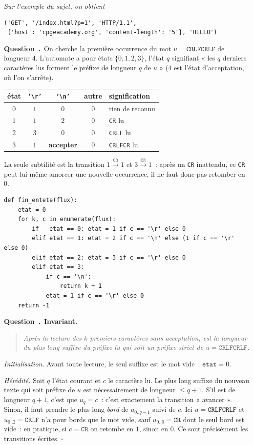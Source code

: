 \documentclass[11pt,a4paper]{article}
\renewcommand{\Q}{\medskip\par\stepcounter{qcnt}\noindent\textbf{\color{cnc}Question~\theqcnt.}~}
\begin{document}
\emph{Sur l'exemple du sujet, on obtient}
\begin{lstlisting}
('GET', '/index.html?p=1', 'HTTP/1.1',
 {'host': 'cpgeacademy.org', 'content-length': '5'}, 'HELLO')
\end{lstlisting}

\Q On cherche la première occurrence du mot $u=\texttt{CRLFCRLF}$ de longueur $4$. L'automate
a pour états $\{0,1,2,3\}$, l'état $q$ signifiant « les $q$ derniers caractères lus forment
le préfixe de longueur $q$ de $u$ » ($4$ est l'état d'acceptation, où l'on s'arrête).

\begin{center}\small
\begin{tabular}{c|c|c|c|l}
état & \texttt{'\textbackslash r'} & \texttt{'\textbackslash n'} & autre &
 signification\\\hline
$0$ & $1$ & $0$ & $0$ & rien de reconnu\\
$1$ & $1$ & $2$ & $0$ & \texttt{CR} lu\\
$2$ & $3$ & $0$ & $0$ & \texttt{CRLF} lu\\
$3$ & $1$ & \textbf{accepter} & $0$ & \texttt{CRLFCR} lu
\end{tabular}
\end{center}
La seule subtilité est la transition $1\xrightarrow{\texttt{CR}}1$ et
$3\xrightarrow{\texttt{CR}}1$~: après un \texttt{CR} inattendu, ce \texttt{CR} peut lui-même
amorcer une nouvelle occurrence, il ne faut donc pas retomber en $0$.
\begin{lstlisting}
def fin_entete(flux):
    etat = 0
    for k, c in enumerate(flux):
        if   etat == 0: etat = 1 if c == '\r' else 0
        elif etat == 1: etat = 2 if c == '\n' else (1 if c == '\r' else 0)
        elif etat == 2: etat = 3 if c == '\r' else 0
        elif etat == 3:
            if c == '\n':
                return k + 1
            etat = 1 if c == '\r' else 0
    return -1
\end{lstlisting}

\Q \textbf{Invariant.}
\begin{quote}\itshape
Après la lecture des $k$ premiers caractères sans acceptation,  est la longueur du
plus long suffixe du préfixe lu qui soit un préfixe strict de $u=\texttt{CRLFCRLF}$.
\end{quote}
\emph{Initialisation.} Avant toute lecture, le seul suffixe est le mot vide~: $\texttt{etat}=0$.

\emph{Hérédité.} Soit $q$ l'état courant et $c$ le caractère lu. Le plus long suffixe du
nouveau texte qui soit préfixe de $u$ est nécessairement de longueur $\le q+1$. S'il est de
longueur $q+1$, c'est que $u_{q}=c$~: c'est exactement la transition « avancer ». Sinon, il
faut prendre le plus long \emph{bord} de $u_{0..q-1}$ suivi de $c$. Ici $u=\texttt{CRLFCRLF}$
et $u_{0..2}=\texttt{CRLF}$ n'a pour bords que le mot vide, sauf $u_{0..0}=\texttt{CR}$ dont
le seul bord est vide~: en pratique, si $c=\texttt{CR}$ on retombe en $1$, sinon en $0$. Ce
sont précisément les transitions écrites. \hfill$\square$
\end{document}
